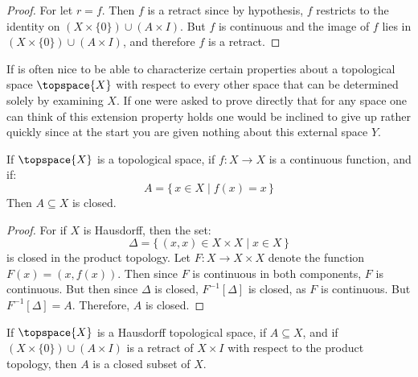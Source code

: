 \documentclass{book}                                                           %
\begin{document}
                \begin{proof}
                    For let $r=f$. Then $f$ is a retract since by hypothesis,
                    $f$ restricts to the identity on
                    $(X\times\{0\})\cup(A\times{I})$. But $f$ is continuous and
                    the image of $f$ lies in $(X\times\{0\})\cup(A\times{I})$,
                    and therefore $f$ is a retract.
                \end{proof}
                If is often nice to be able to characterize certain properties
                about a topological space $\topspace{X}$ with respect to every
                other space that can be determined solely by examining $X$. If
                one were asked to prove directly that for any space one can
                think of this extension property holds one would be inclined to
                give up rather quickly since at the start you are given nothing
                about this external space $Y$.
                \begin{theorem}
                    If $\topspace{X}$ is a topological space, if
                    $f:X\rightarrow{X}$ is a continuous function, and if:
                    \begin{equation}
                        A=\{\,x\in{X}\;|\;f(x)=x\,\}
                    \end{equation}
                    Then $A\subseteq{X}$ is closed.
                \end{theorem}
                \begin{proof}
                    For if $X$ is Hausdorff, then the set:
                    \begin{equation}
                        \Delta=\{\,(x,x)\in{X}\times{X}\;|\;x\in{X}\,\}
                    \end{equation}
                    is closed in the product topology. Let
                    $F:X\rightarrow{X}\times{X}$ denote the function
                    $F(x)=(x,f(x))$. Then since $F$ is continuous in both
                    components, $F$ is continuous. But then since $\Delta$ is
                    closed, $F^{\minus{1}}[\Delta]$ is closed, as $F$ is
                    continuous. But $F^{\minus{1}}[\Delta]=A$. Therefore, $A$ is
                    closed.
                \end{proof}
                \begin{theorem}
                    If $\topspace{X}$ is a Hausdorff topological space, if
                    $A\subseteq{X}$, and if $(X\times\{0\})\cup(A\times{I})$ is
                    a retract of $X\times{I}$ with respect to the product
                    topology, then $A$ is a closed subset of $X$.
                \end{theorem}
\end{document}
